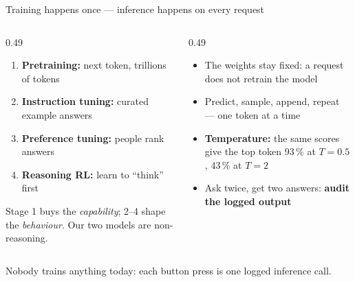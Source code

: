 \begin{frame}{Training happens once --- inference happens on every request}
  \begin{columns}[T,onlytextwidth]
    \begin{column}{0.49\textwidth}
      \begin{readme}
        \footnotesize
        \begin{enumerate}\setlength{\itemsep}{0pt}
          \item \textbf{Pretraining:} next token, trillions of tokens
          \item \textbf{Instruction tuning:} curated example answers
          \item \textbf{Preference tuning:} people rank answers
          \item \textbf{Reasoning RL:} learn to ``think'' first
        \end{enumerate}
        Stage 1 buys the \emph{capability}; 2--4 shape the \emph{behaviour}. Our two models are non-reasoning.
      \end{readme}
    \end{column}
    \begin{column}{0.49\textwidth}
      \begin{numexample}
        \footnotesize
        \begin{itemize}\setlength{\itemsep}{0pt}
          \item The weights stay fixed: a request does not retrain the model
          \item Predict, sample, append, repeat --- one token at a time
          \item \textbf{Temperature:} the same scores give the top token 93\,\% at $T=0.5$, 43\,\% at $T=2$
          \item Ask twice, get two answers: \textbf{audit the logged output}
        \end{itemize}
      \end{numexample}
    \end{column}
  \end{columns}
  \begin{takeaway}
    Nobody trains anything today: each button press is one logged inference call.
  \end{takeaway}
\end{frame}
